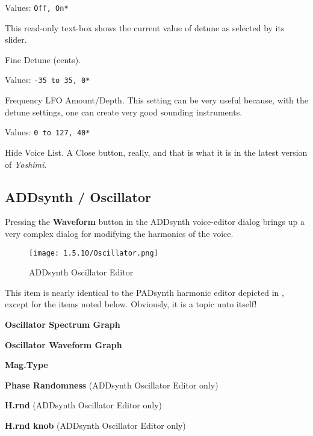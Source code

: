    Values: \texttt{Off, On*}

   This read-only text-box shows the current value of detune as selected by
   its slider.

   Fine Detune (cents).

   Values: \texttt{-35 to 35, 0*}

   Frequency LFO Amount/Depth.
   This setting can be very useful because, with the detune settings, one can
   create very good sounding instruments.

   Values: \texttt{0 to 127, 40*}

   Hide Voice List.  A Close button, really, and that is what it is in the
   latest version of \textsl{Yoshimi}.

\subsection{ADDsynth / Oscillator}
\label{subsec:addsynth_oscillator}

   Pressing the \textbf{Waveform} button in the ADDsynth
   voice-editor dialog brings up a very complex dialog for modifying the
   harmonics of the voice.

\begin{figure}[H]
   \centering
   \texttt{[image: 1.5.10/Oscillator.png]}
   \caption{ADDsynth Oscillator Editor}
   \label{fig:addsynth_oscillator_editor}
\end{figure}

   This item is nearly identical to the PADsynth harmonic editor depicted in
   ,
   except for the items noted below.
   Obviously, it is a topic unto itself!

   \begin{enumber}
      \item \textbf{Oscillator Spectrum Graph}
      \item \textbf{Oscillator Waveform Graph}
      \item \textbf{Mag.Type}
      \item \textbf{Phase Randomness} (ADDsynth Oscillator Editor only)
      \item \textbf{H.rnd} (ADDsynth Oscillator Editor only)
      \item \textbf{H.rnd knob} (ADDsynth Oscillator Editor only)
   \end{enumber}

